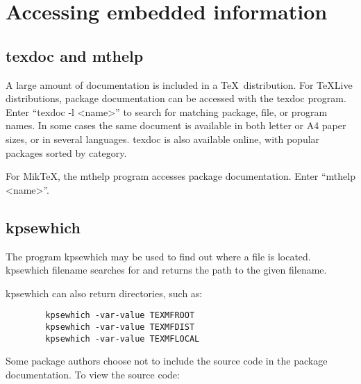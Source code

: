 \documentclass{article}
\def\TeX{TeX}%
\def\prog#1{\detokenize{#1}}%
\renewcommand*{\prog}[1]{#1}
\renewcommand*{\TeX}{TeX}
\begin{document}
\section{Accessing embedded information}

\subsection{\prog{texdoc} and \prog{mthelp}}

A large amount of documentation is included in a \TeX\ distribution.
For TeXLive distributions, package documentation
can be accessed with the \prog{texdoc} program.
Enter ``\prog{texdoc -l <name>}'' to search for
matching package, file, or program names.  In some cases the same document
is available in both letter or A4 paper sizes, or in several languages.
\prog{texdoc} is also available online,
with popular packages sorted by category. 

For Mik\TeX, the \prog{mthelp} program accesses package documentation.
Enter ``\prog{mthelp <name>}''.

\subsection{\prog{kpsewhich}}

The program \prog{kpsewhich} may be used to find out where a file is
located.  \prog{kpsewhich filename} searches for and returns the
path to the given filename.

\prog{kpsewhich} can also return directories, such as:
\begin{verbatim}
        kpsewhich -var-value TEXMFROOT
        kpsewhich -var-value TEXMFDIST
        kpsewhich -var-value TEXMFLOCAL
\end{verbatim}
\medskip

Some package authors choose not to include the source code in the
package documentation.  To view the source code:
\end{document}
